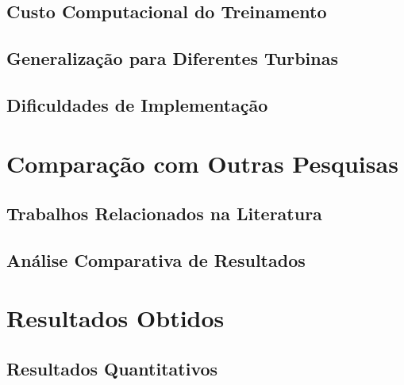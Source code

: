 \documentclass[12pt,a4paper]{article}
\begin{document}
\subsection{Custo Computacional do Treinamento}

\subsection{Generalização para Diferentes Turbinas}

\subsection{Dificuldades de Implementação}

\section{Comparação com Outras Pesquisas}

\subsection{Trabalhos Relacionados na Literatura}

\subsection{Análise Comparativa de Resultados}


\section{Resultados Obtidos}

\subsection{Resultados Quantitativos}

\end{document}
